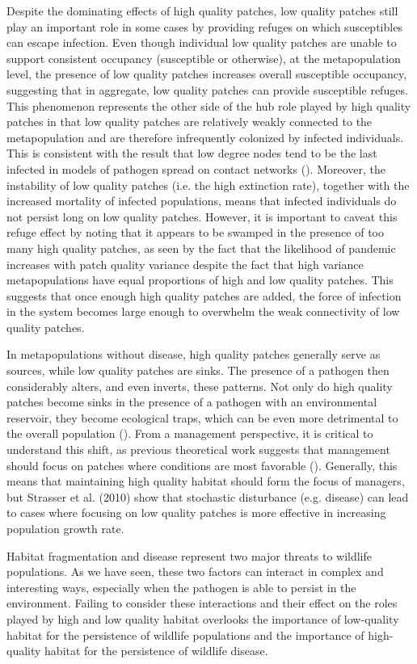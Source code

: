 \documentclass{svjour3}
\begin{document}
Despite the dominating effects of high quality patches, low quality patches still play an important role in some cases by providing refuges on which susceptibles can escape infection. Even though individual low quality patches are unable to support consistent occupancy (susceptible or otherwise), at the metapopulation level, the presence of low quality patches increases overall susceptible occupancy, suggesting that in aggregate, low quality patches can provide susceptible refuges.  This phenomenon represents the other side of the hub role played by high quality patches in that low quality patches are relatively weakly connected to the metapopulation and are therefore infrequently colonized by infected individuals.  This is consistent with the result that low degree nodes tend to be the last infected in models of pathogen spread on contact networks (\cite{Barthelemy2004}).  Moreover, the instability of low quality patches (i.e. the high extinction rate), together with the increased mortality of infected populations, means that infected individuals do not persist long on low quality patches.   However, it is important to caveat this refuge effect by noting that it appears to be swamped in the presence of too many high quality patches, as seen by the fact that the likelihood of pandemic increases with patch quality variance despite the fact that high variance metapopulations have equal proportions of high and low quality patches.  This suggests that once enough high quality patches are added, the force of infection in the system becomes large enough to overwhelm the weak connectivity of low quality patches.  

In metapopulations without disease, high quality patches generally serve as sources, while low quality patches are sinks.  The presence of a pathogen then considerably alters, and even inverts, these patterns.  Not only do high quality patches become sinks in the presence of a pathogen with an environmental reservoir, they become ecological traps, which can be even more detrimental to the overall population (\cite{Kristan2003}).  From a management perspective, it is critical to understand this shift, as previous theoretical work suggests that management should focus on patches where conditions are most favorable (\cite{Strasser2010}).  Generally, this means that maintaining high quality habitat should form the focus of managers, but Strasser et al. (2010) show that stochastic disturbance (e.g. disease) can lead to cases where focusing on low quality patches is more effective in increasing population growth rate.

Habitat fragmentation and disease represent two major threats to wildlife populations.  As we have seen, these two factors can interact in complex and interesting ways, especially when the pathogen is able to persist in the environment.  Failing to consider these interactions and their effect on the roles played by high and low quality habitat overlooks the importance of low-quality habitat for the persistence of wildlife populations and the importance of high-quality habitat for the persistence of wildlife disease.




     
\end{document}
